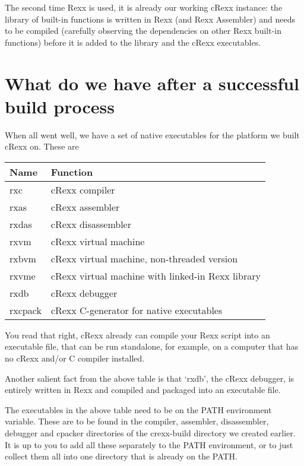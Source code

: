 The second time Rexx is used, it is already our working cRexx instance:
the library of built-in functions is written in Rexx (and Rexx
Assembler) and needs to be compiled (carefully observing the
dependencies on other Rexx built-in functions) before it is added to the
library and the cRexx executables.

\hypertarget{what-do-we-have-after-a-successful-build-process}{%
\section{What do we have after a successful build
process}\label{what-do-we-have-after-a-successful-build-process}}

When all went well, we have a set of native executables for the platform
we built cRexx on. These are

\begin{longtable}[]{@{}ll@{}}
\toprule()
Name & Function \\
\midrule()
\endhead
rxc & cRexx compiler \\
rxas & cRexx assembler \\
rxdas & cRexx disassembler \\
rxvm & cRexx virtual machine \\
rxbvm & cRexx virtual machine, non-threaded version \\
rxvme & cRexx virtual machine with linked-in Rexx library \\
rxdb & cRexx debugger \\
rxcpack & cRexx C-generator for native executables \\
\bottomrule()
\end{longtable}

You read that right, cRexx already can compile your Rexx script into an
executable file, that can be run standalone, for example, on a computer
that has no cRexx and/or C compiler installed.

Another salient fact from the above table is that `rxdb', the cRexx
debugger, is entirely written in Rexx and compiled and packaged into an
executable file.

The executables in the above table need to be on the PATH environment
variable. These are to be found in the compiler, assembler,
disassembler, debugger and cpacker directories of the crexx-build
directory we created earlier. It is up to you to add all these
separately to the PATH environment, or to just collect them all into one
directory that is already on the PATH.
